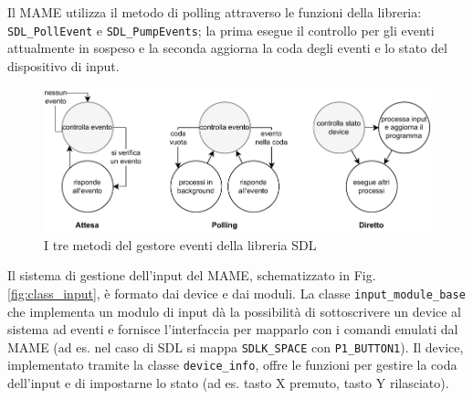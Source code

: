 Il MAME utilizza il metodo di polling attraverso le funzioni della libreria: \verb|SDL_PollEvent| e \verb|SDL_PumpEvents|; la prima esegue il controllo per gli eventi attualmente in sospeso e la seconda aggiorna la coda degli eventi e lo stato del dispositivo di input.

\begin{figure}[H]
	\includegraphics[width=\linewidth]{immagini/input_event_mode}
	\caption{I tre metodi del gestore eventi della libreria SDL}
	\label{fig:input_event_mode}
\end{figure}




Il sistema di gestione dell'input del MAME, schematizzato in Fig. \ref{fig:class_input}, è formato dai device e dai moduli. La classe \verb|input_module_base| che implementa un modulo di input dà la possibilità di sottoscrivere un device al sistema ad eventi e fornisce l'interfaccia per mapparlo con i comandi emulati dal MAME (ad es. nel caso di SDL si mappa \verb|SDLK_SPACE| con \verb|P1_BUTTON1|). Il device, implementato tramite la classe \verb|device_info|, offre le funzioni per gestire la coda dell'input e di impostarne lo stato (ad es. tasto X premuto, tasto Y rilasciato).

